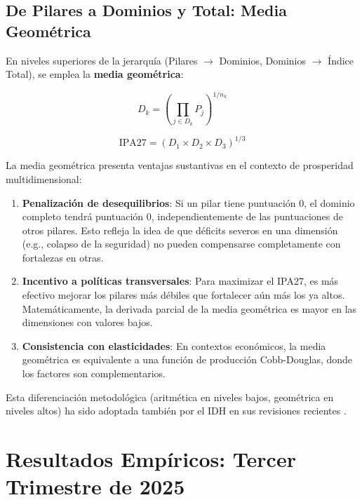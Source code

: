 \documentclass[authoryear,12pt]{elsarticle}
\begin{document}
\subsection{De Pilares a Dominios y Total: Media Geométrica}

En niveles superiores de la jerarquía (Pilares $\to$ Dominios, Dominios $\to$ Índice Total), se emplea la \textbf{media geométrica}:

\begin{equation}
D_k = \left( \prod_{j \in D_k} P_j \right)^{1/n_k}
\end{equation}

\begin{equation}
\text{IPA27} = \left( D_1 \times D_2 \times D_3 \right)^{1/3}
\end{equation}

La media geométrica presenta ventajas sustantivas en el contexto de prosperidad multidimensional:

\begin{enumerate}
    \item \textbf{Penalización de desequilibrios}: Si un pilar tiene puntuación 0, el dominio completo tendrá puntuación 0, independientemente de las puntuaciones de otros pilares. Esto refleja la idea de que déficits severos en una dimensión (e.g., colapso de la seguridad) no pueden compensarse completamente con fortalezas en otras.

    \item \textbf{Incentivo a políticas transversales}: Para maximizar el IPA27, es más efectivo mejorar los pilares más débiles que fortalecer aún más los ya altos. Matemáticamente, la derivada parcial de la media geométrica es mayor en las dimensiones con valores bajos.

    \item \textbf{Consistencia con elasticidades}: En contextos económicos, la media geométrica es equivalente a una función de producción Cobb-Douglas, donde los factores son complementarios.
\end{enumerate}

Esta diferenciación metodológica (aritmética en niveles bajos, geométrica en niveles altos) ha sido adoptada también por el IDH en sus revisiones recientes \citep{undp2010human}.

\section{Resultados Empíricos: Tercer Trimestre de 2025}
\end{document}
